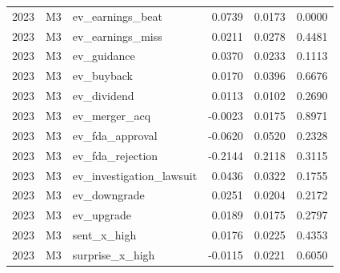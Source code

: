 \begin{tabular}{rllrrr}
2023 & M3 & ev\_earnings\_beat & 0.0739 & 0.0173 & 0.0000 \\
2023 & M3 & ev\_earnings\_miss & 0.0211 & 0.0278 & 0.4481 \\
2023 & M3 & ev\_guidance & 0.0370 & 0.0233 & 0.1113 \\
2023 & M3 & ev\_buyback & 0.0170 & 0.0396 & 0.6676 \\
2023 & M3 & ev\_dividend & 0.0113 & 0.0102 & 0.2690 \\
2023 & M3 & ev\_merger\_acq & -0.0023 & 0.0175 & 0.8971 \\
2023 & M3 & ev\_fda\_approval & -0.0620 & 0.0520 & 0.2328 \\
2023 & M3 & ev\_fda\_rejection & -0.2144 & 0.2118 & 0.3115 \\
2023 & M3 & ev\_investigation\_lawsuit & 0.0436 & 0.0322 & 0.1755 \\
2023 & M3 & ev\_downgrade & 0.0251 & 0.0204 & 0.2172 \\
2023 & M3 & ev\_upgrade & 0.0189 & 0.0175 & 0.2797 \\
2023 & M3 & sent\_x\_high & 0.0176 & 0.0225 & 0.4353 \\
2023 & M3 & surprise\_x\_high & -0.0115 & 0.0221 & 0.6050 \\
\bottomrule
\end{tabular}
